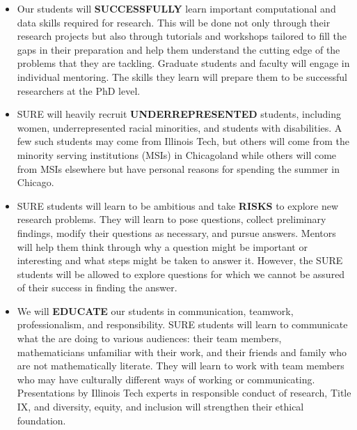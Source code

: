 \documentclass[11pt]{NSFamsart}
\begin{document}
\begin{itemize}

\item Our students will \uppercase{\textbf{successfully}} learn important computational and data skills required for research.  This will be done not only through their research projects but also through tutorials and workshops tailored to fill the gaps in their preparation and help them understand the cutting edge of the problems that they are tackling.  Graduate students and faculty will engage in individual mentoring. The skills they learn will prepare them to be successful researchers at the PhD level.

\item SURE will heavily recruit \uppercase{\textbf{underrepresented}} students, including women, underrepresented racial minorities, and students with disabilities.  A few such students may come from Illinois Tech, but others will come from the minority serving institutions (MSIs) in Chicagoland while others will come from MSIs elsewhere but have personal reasons for spending the summer in Chicago.

\item SURE students will learn to be ambitious and take \uppercase{\textbf{RISKS}} to explore new research problems.  They will learn to pose questions, collect preliminary findings, modify their questions as necessary, and pursue answers.  Mentors will help them think through why a question might be important or interesting and what steps might be taken to answer it.  However, the SURE students will be allowed to explore questions for which we cannot be assured of their success in finding the answer.

\item We will \uppercase{\textbf{educate}} our students in communication, teamwork,  professionalism, and responsibility.  SURE students will learn to communicate what the are doing to various audiences: their team members, mathematicians unfamiliar with their work, and their friends and family who are not mathematically literate.  They will learn to work with team members who may have culturally different ways of working or communicating.  Presentations by Illinois Tech experts in responsible conduct of research, Title IX, and diversity, equity, and inclusion will strengthen their ethical foundation.
\end{itemize}
\end{document}
